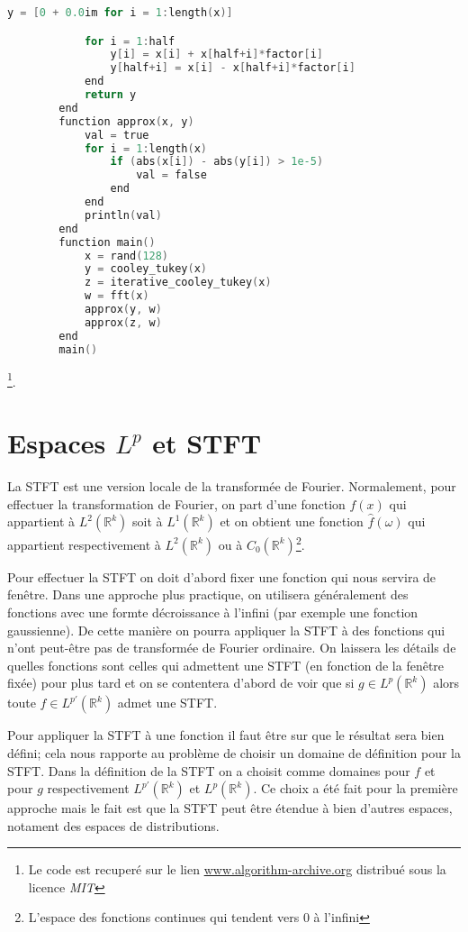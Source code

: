 \begin{lstlisting}[language=C, caption= Cooley-Tukey with Butterfly Diagrams ]
		    y = [0 + 0.0im for i = 1:length(x)]

		    for i = 1:half
		        y[i] = x[i] + x[half+i]*factor[i]
		        y[half+i] = x[i] - x[half+i]*factor[i]
		    end
		    return y
		end
		function approx(x, y)
		    val = true
		    for i = 1:length(x)
		        if (abs(x[i]) - abs(y[i]) > 1e-5)
		            val = false
		        end
		    end
		    println(val)
		end
		function main()
		    x = rand(128)
		    y = cooley_tukey(x)
		    z = iterative_cooley_tukey(x)
		    w = fft(x)
		    approx(y, w)
		    approx(z, w)
		end
		main()
	\end{lstlisting}\footnote{Le code est recuperé sur le lien \href{https://www.algorithm-archive.org/contents/cooley_tukey/cooley_tukey.html}{www.algorithm-archive.org} distribué sous la licence \textit{MIT}}.


	\section{Espaces $L^p$ et STFT}

	La STFT est une version locale de la transformée de Fourier. Normalement, pour effectuer la transformation de Fourier, on part d'une fonction $f(x)$ qui appartient à $L^{2} (\mathbb{R}^k)$ soit à $L^{1} (\mathbb{R}^k)$ et on obtient une fonction $\hat{f}(\omega)$ qui appartient respectivement à $L^{2} (\mathbb{R}^k)$ ou à $C_{0}(\mathbb{R}^{k})$\footnote{L'espace des fonctions continues qui tendent vers $0$ à l'infini}.

	Pour effectuer la STFT on doit d'abord fixer une fonction qui nous servira de fenêtre. Dans une approche plus practique, on utilisera généralement des fonctions avec une formte décroissance à l'infini (par exemple une fonction gaussienne). De cette manière on pourra appliquer la STFT à des fonctions qui n'ont peut-être pas de transformée de Fourier ordinaire. On laissera les détails de quelles fonctions sont celles qui admettent une STFT (en fonction de la fenêtre fixée) pour plus tard et on se contentera d'abord de voir que si $g\in L^{p}(\mathbb{R}^{k})$ alors toute $f\in L^{p'} (\mathbb{R}^k)$ admet une STFT.

	Pour appliquer la STFT à une fonction il faut être sur que le résultat sera bien défini; cela nous rapporte au problème de choisir un domaine de définition pour la STFT.
	Dans la définition de la STFT on a choisit comme domaines pour $f$ et pour $g$ respectivement $L^{p'} (\mathbb{R}^k) $ et $L^p (\mathbb{R}^k)$. Ce choix a été fait pour la première approche mais le fait est que la STFT peut être étendue à bien d'autres espaces, notament des espaces de distributions.

